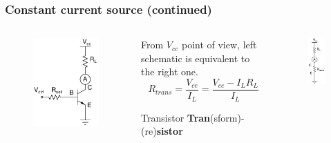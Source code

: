 \documentclass[beamer]{standalone}
\begin{document}
\begin{frame}
\frametitle{Constant current source (continued)}
 \begin{columns}[c]
  \begin{column}{.25\textwidth}
   \begin{figure}
    \includegraphics[height=0.30\textheight]{./schematics/npn_constant_current_source.pdf}
   \end{figure}
  \end{column}
  \begin{column}{.6\textwidth}
   From $V_{cc}$ point of view,
   left schematic is equivalent to the right one.
   \[
   R_{trans} = \frac{ V_{ce}} {I_L}
   = \frac{V_{cc} - I_L R_L}{I_L}
   \]
   \begin{block}{Transistor}
    {\bf Tran}(sform)-(re){\bf sistor}
   \end{block}
  \end{column}
  \begin{column}{.25\textwidth}
   \begin{figure}
    \includegraphics[height=0.30\textheight]{./schematics/npn_constant_current_source_equivalent.pdf}

\end{figure}
\end{column}
\end{columns}
\end{frame}
\end{document}
